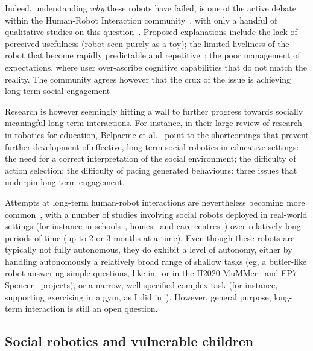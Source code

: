 Indeed, understanding \emph{why} these robots have failed, is one of the
active debate within the Human-Robot Interaction
community~\cite{hoffman2019anki}, with only a handful of qualitative studies on
this question~\cite{dereshev2019longterm,degraaf2017phased}. Proposed
explanations include the lack of perceived usefulness (robot seen purely as a
toy); the limited liveliness of the robot that become rapidly predictable and
repetitive~\cite{lemaignan2014cognitive}; the poor management of expectations,
where user over-ascribe cognitive capabilities that do not match the reality.
The community agrees however that the crux of the issue is achieving long-term
social engagement~\cite{yang2018grand,hoffman2019anki}

Research is however seemingly hitting a wall to further progress towards
socially meaningful long-term interactions. For instance, in their large review
of research in robotics for education, Belpaeme et al.~\cite{belpaeme2018social}
point to the shortcomings that prevent further development of effective,
long-term social robotics in educative settings: the need for a correct
interpretation of the social environment; the difficulty of action selection;
the difficulty of pacing generated behaviours: three issues that underpin
long-term engagement.

Attempts at long-term human-robot interactions are nevertheless becoming more
common~\cite{kunze2018artificial,leite2013social}, with a number of studies
involving social robots deployed in real-world settings (for instance in
schools~\cite{leite2014empathic,westlund2017measuring,
lemaignan2016learning,coninx2016towards}, homes~\cite{degraaf2017phased} and
care centres~\cite{hawes2017strands,winkle2020couch}) over relatively long
periods of time (up to 2 or 3 months at a time). Even though these robots are
typically not fully autonomous, they do exhibit a level of autonomy, either by
handling autonomously a relatively broad range of shallow tasks (eg, a
butler-like robot answering simple questions, like in~\cite{hawes2017strands} or
in the H2020 MuMMer~\cite{heikkila2018can} and FP7
Spencer~\cite{triebel2016spencer} projects), or a narrow, well-specified complex
task (for instance, supporting exercising in a gym, as I did in~\cite{winkle2020couch}).
However, general purpose, long-term interaction is still an open question.


\subsection{Social robotics and vulnerable children}

